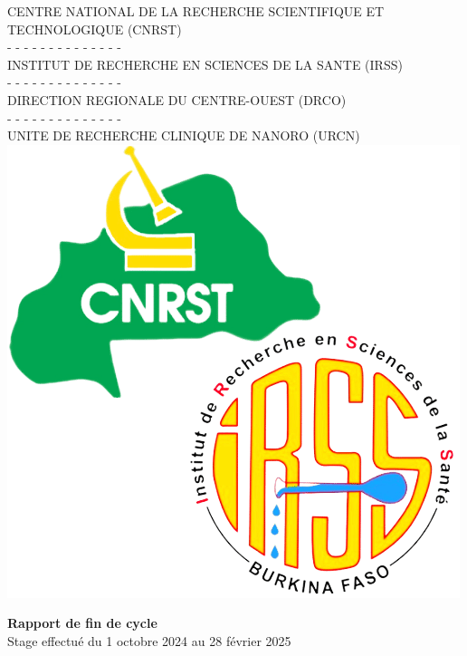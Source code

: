 \documentclass[12pt,a4paper]{report}
\begin{document}
	\hspace{0.1\textwidth}
	\noindent
	\begin{minipage}[t]{0.45\textwidth}
		\fontsize{10pt}{0.4cm}\selectfont
		\begin{center}
			CENTRE NATIONAL DE LA RECHERCHE SCIENTIFIQUE ET TECHNOLOGIQUE (CNRST)\\
			- - - - - - - - - - - - - - \\
			INSTITUT DE RECHERCHE EN SCIENCES DE LA SANTE (IRSS)\\
			- - - - - - - - - - - - - - \\
			DIRECTION REGIONALE DU CENTRE-OUEST (DRCO)\\
			- - - - - - - - - - - - - -\\
			UNITE DE RECHERCHE CLINIQUE DE NANORO (URCN)\\ \vspace{0.4cm}
			\includegraphics[scale=0.25]{urcn1.png}
		\end{center}
		
	\end{minipage}
	
	\vspace{1cm}
	
	\begin{center}
		\textcolor{black!70}{\textbf{\LARGE Rapport de fin de cycle}}\\
		\large Stage effectué du 1 octobre 2024 au 28 février 2025 \\
	\end{center}
	
\end{document}
